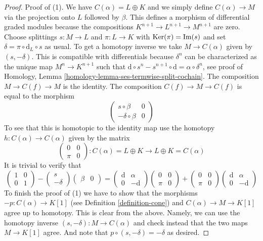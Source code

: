 \begin{proof}
Proof of (1). We have $C(\alpha) = L \oplus K$ and we simply define
$C(\alpha) \to M$ via the projection onto $L$ followed by $\beta$.
This defines a morphism of differential graded modules because the
compositions $K^{n + 1} \to L^{n + 1} \to M^{n + 1}$ are zero.
Choose splittings $s : M \to L$ and $\pi : L \to K$ with
$\mathop{\mathrm{Ker}}(\pi) = \mathop{\mathrm{Im}}(s)$ and set
$\delta = \pi \circ \text{d}_L \circ s$ as usual.
To get a homotopy inverse we take
$M \to C(\alpha)$ given by $(s , -\delta)$. This is compatible with
differentials because $\delta^n$ can be characterized as the
unique map $M^n \to K^{n + 1}$ such that
$\text{d} \circ s^n - s^{n + 1} \circ \text{d} = \alpha \circ \delta^n$,
see proof of
Homology, Lemma \ref{homology-lemma-ses-termwise-split-cochain}.
The composition $M \to C(f) \to M$ is the identity.
The composition $C(f) \to M \to C(f)$ is equal to the morphism
$$
\left(
\begin{matrix}
s \circ \beta & 0 \\
-\delta \circ \beta & 0
\end{matrix}
\right)
$$
To see that this is homotopic to the identity map
use the homotopy $h : C(\alpha) \to C(\alpha)$
given by the matrix
$$
\left(
\begin{matrix}
0 & 0 \\
\pi & 0
\end{matrix}
\right) :
C(\alpha) = L \oplus K
\to
L \oplus K = C(\alpha)
$$
It is trivial to verify that
$$
\left(
\begin{matrix}
1 & 0 \\
0 & 1
\end{matrix}
\right)
-
\left(
\begin{matrix}
s \\
-\delta
\end{matrix}
\right)
\left(
\begin{matrix}
\beta & 0
\end{matrix}
\right)
=
\left(
\begin{matrix}
\text{d} & \alpha \\
0 & -\text{d}
\end{matrix}
\right)
\left(
\begin{matrix}
0 & 0 \\
\pi & 0
\end{matrix}
\right)
+
\left(
\begin{matrix}
0 & 0 \\
\pi & 0
\end{matrix}
\right)
\left(
\begin{matrix}
\text{d} & \alpha \\
0 & -\text{d}
\end{matrix}
\right)
$$
To finish the proof of (1) we have to show that the morphisms
$-p : C(\alpha) \to K[1]$ (see
Definition \ref{definition-cone})
and $C(\alpha) \to M \to K[1]$ agree up
to homotopy. This is clear from the above. Namely, we can use the homotopy
inverse $(s, -\delta) : M \to C(\alpha)$
and check instead that the two maps
$M \to K[1]$ agree. And note that
$p \circ (s, -\delta) = -\delta$ as desired.


\end{proof}
